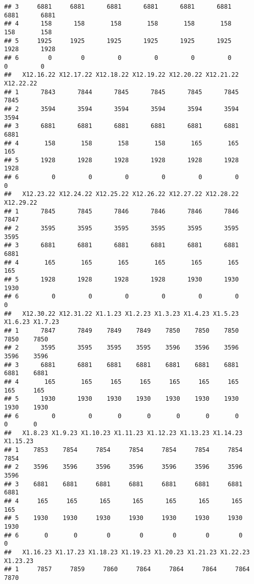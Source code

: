 \documentclass[
]{article}
\begin{document}
\begin{verbatim}
## 3     6881     6881      6881      6881      6881      6881      6881      6881
## 4      158      158       158       158       158       158       158       158
## 5     1925     1925      1925      1925      1925      1925      1928      1928
## 6        0        0         0         0         0         0         0         0
##   X12.16.22 X12.17.22 X12.18.22 X12.19.22 X12.20.22 X12.21.22 X12.22.22
## 1      7843      7844      7845      7845      7845      7845      7845
## 2      3594      3594      3594      3594      3594      3594      3594
## 3      6881      6881      6881      6881      6881      6881      6881
## 4       158       158       158       158       165       165       165
## 5      1928      1928      1928      1928      1928      1928      1928
## 6         0         0         0         0         0         0         0
##   X12.23.22 X12.24.22 X12.25.22 X12.26.22 X12.27.22 X12.28.22 X12.29.22
## 1      7845      7845      7846      7846      7846      7846      7847
## 2      3595      3595      3595      3595      3595      3595      3595
## 3      6881      6881      6881      6881      6881      6881      6881
## 4       165       165       165       165       165       165       165
## 5      1928      1928      1928      1928      1930      1930      1930
## 6         0         0         0         0         0         0         0
##   X12.30.22 X12.31.22 X1.1.23 X1.2.23 X1.3.23 X1.4.23 X1.5.23 X1.6.23 X1.7.23
## 1      7847      7849    7849    7849    7850    7850    7850    7850    7850
## 2      3595      3595    3595    3595    3596    3596    3596    3596    3596
## 3      6881      6881    6881    6881    6881    6881    6881    6881    6881
## 4       165       165     165     165     165     165     165     165     165
## 5      1930      1930    1930    1930    1930    1930    1930    1930    1930
## 6         0         0       0       0       0       0       0       0       0
##   X1.8.23 X1.9.23 X1.10.23 X1.11.23 X1.12.23 X1.13.23 X1.14.23 X1.15.23
## 1    7853    7854     7854     7854     7854     7854     7854     7854
## 2    3596    3596     3596     3596     3596     3596     3596     3596
## 3    6881    6881     6881     6881     6881     6881     6881     6881
## 4     165     165      165      165      165      165      165      165
## 5    1930    1930     1930     1930     1930     1930     1930     1930
## 6       0       0        0        0        0        0        0        0
##   X1.16.23 X1.17.23 X1.18.23 X1.19.23 X1.20.23 X1.21.23 X1.22.23 X1.23.23
## 1     7857     7859     7860     7864     7864     7864     7864     7870

\end{verbatim}
\end{document}

